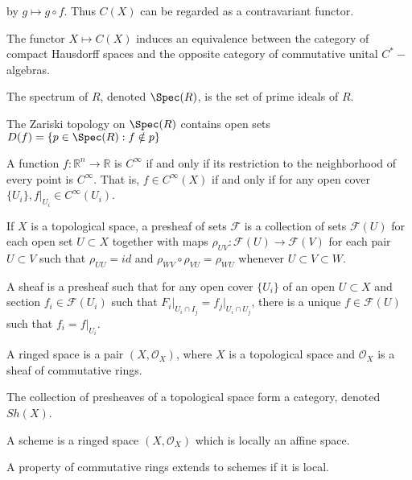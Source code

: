 \documentclass[crop=false,class=article,oneside]{standalone}
\begin{document}
            by $g\mapsto{g}\circ f$. Thus $C(X)$ can be
            regarded as a contravariant functor. 
            \begin{theorem}[Gelfand]
                The functor $X\mapsto C(X)$ induces an
                equivalence between the category of compact
                Hausdorff spaces and the opposite category of
                commutative unital $C^{*}-$algebras.
            \end{theorem}
            \begin{definition}
                The spectrum of $R$, denoted $\Spec(R)$,
                is the set of prime ideals of $R$.
            \end{definition}
            \begin{theorem}
                The Zariski topology on $\Spec(R)$
                contains open sets
                $D(f)=\{p\in\Spec(R):f\notin{p}\}$
            \end{theorem}
            A function $f:\mathbb{R}^{n}\rightarrow\mathbb{R}$
            is $C^{\infty}$ if and only if its restriction to
            the neighborhood of every point is $C^{\infty}$.
            That is, $f\in{C}^{\infty}(X)$ if and only if
            for any open cover
            $\{U_{i}\},f\big|_{U_{i}}\in{C}^{\infty}(U_i)$.
            \begin{definition}
                If $X$ is a topological space, a presheaf
                of sets $\mathcal{F}$ is a collection of
                sets $\mathcal{F}(U)$ for each open set
                $U\subset X$ together with maps
                $\rho_{UV}:\mathcal{F}(U)\rightarrow \mathcal{F}(V)$
                for each pair $U\subset V$ such that $\rho_{UU}=id$
                and $\rho_{WV}\circ\rho_{VU}=\rho_{WU}$
                whenever $U\subset{V}\subset{W}$.
            \end{definition}
            \begin{definition}
                A sheaf is a presheaf such that for any open
                cover $\{U_i\}$ of an open $U\subset{X}$ and
                section $f_{i}\in\mathcal{F}(U_{i})$ such that
                $F_{i}\big|_{U_{i}\cap I_{j}}%
                 =f_{j}\big|_{U_{i}\cap U_{j}}$,
                there is a unique $f\in\mathcal{F}(U)$
                such that $f_{i}=f\big|_{U_{i}}$.
            \end{definition}
            \begin{definition}
                A ringed space is a pair $(X,\mathcal{O}_{X})$,
                where $X$ is a topological space and
                $\mathcal{O}_{X}$ is a sheaf of commutative rings.
            \end{definition}
            The collection of presheaves of a topological space
            form a category, denoted $Sh(X)$. 
            \begin{definition}
                A scheme is a ringed space $(X,\mathcal{O}_X)$
                which is locally an affine space.
            \end{definition}
            \begin{theorem}
                A property of commutative rings extends
                to schemes if it is local.
            \end{theorem}
\end{document}
